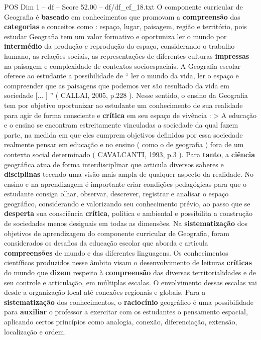 \begin{textsample}{POS Dim 1 – df – Score 52.00 – df/df\_ef\_18.txt}
O componente curricular de Geografia é \textbf{baseado} em conhecimentos que promovam a \textbf{compreensão} das \textbf{categorias} e conceitos como : espaço, lugar, paisagem, região e território, pois estudar Geografia tem um valor formativo e oportuniza ler o mundo por \textbf{intermédio} da produção e reprodução do espaço, considerando o trabalho humano, as relações sociais, as representações de diferentes culturas \textbf{impressas} na paisagem e complexidade de contextos socioespaciais.
A Geografia escolar oferece ao estudante a possibilidade de “ ler o mundo da vida, ler o espaço e compreender que as paisagens que podemos ver são resultado da vida em sociedade [... ] ” ( CALLAI, 2005, p.228 ).
Nesse sentido, o ensino da Geografia tem por objetivo oportunizar ao estudante um conhecimento de sua realidade para agir de forma consciente e \textbf{crítica} em seu espaço de vivência : > A educação e o ensino se encontram estreitamente vinculadas a sociedade da qual fazem parte, na medida em que eles cumprem objetivos definidos por essa sociedade realmente pensar em educação e no ensino ( como o de geografia ) fora de um contexto social determinado ( CAVALCANTI, 1993, p.3 ).
Para \textbf{tanto}, a \textbf{ciência} geográfica atua de forma interdisciplinar que articula diversos saberes e \textbf{disciplinas} tecendo uma visão mais ampla de qualquer aspecto da realidade.
No ensino e na aprendizagem é importante criar condições pedagógicas para que o estudante consiga olhar, observar, descrever, registrar e analisar o espaço geográfico, considerando e valorizando seu conhecimento prévio, ao passo que se \textbf{desperta} sua consciência \textbf{crítica}, política e ambiental e possibilita a construção de sociedades menos desiguais em todas as dimensões.
Na \textbf{sistematização} dos objetivos de aprendizagem do componente curricular de Geografia, foram considerados os desafios da educação escolar que aborda e articula \textbf{compreensões} de mundo e das diferentes linguagens.
Os conhecimentos científicos produzidos nesse âmbito visam o desenvolvimento de leituras \textbf{críticas} do mundo que \textbf{dizem} respeito à \textbf{compreensão} das diversas territorialidades e de seu controle e articulação, em múltiplas escalas.
O envolvimento dessas escalas vai desde a organização local até conexões regionais e globais.
Para a \textbf{sistematização} dos conhecimentos, o \textbf{raciocínio} geográfico é uma possibilidade para \textbf{auxiliar} o professor a exercitar com os estudantes o pensamento espacial, aplicando certos princípios como analogia, conexão, diferenciação, extensão, localização e ordem.

\end{textsample}

